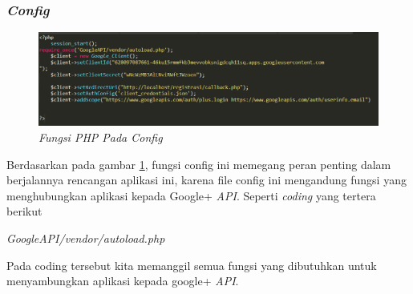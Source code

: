 \subsubsection{\textit{Config}}
\begin{figure}[!htbp]
    \centering
    \includegraphics[scale=0.5]{gambar/config}
    \caption{\textit{Fungsi PHP Pada Config}}
    \label{config}
\end{figure}
\par 
Berdasarkan pada gambar \ref{config}, fungsi config ini memegang peran penting dalam berjalannya rencangan aplikasi ini, karena file config ini mengandung fungsi yang menghubungkan aplikasi kepada Google+ \textit{API}. Seperti \textit{coding} yang tertera berikut
\par 
\textit{GoogleAPI/vendor/autoload.php}
\par 
Pada coding tersebut kita memanggil semua fungsi yang dibutuhkan untuk menyambungkan aplikasi kepada google+ \textit{API}.

